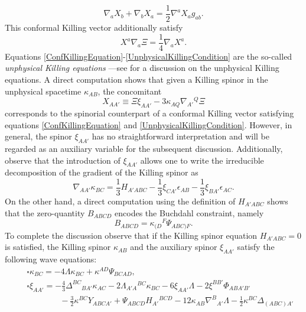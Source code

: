 \documentclass[10pt,a4paper]{article}
\theoremstyle{plain}
\begin{document}
\begin{equation}\label{ConfKillingEquation}
\nabla_{a}X_{b}+ \nabla_{b}X_{a}=\frac{1}{2}\nabla^{a}X_{a}g_{ab}.
\end{equation}
This conformal Killing vector additionally satisfy
\begin{equation}
\label{UnphysicalKillingCondition}
X^{a}\nabla_{a}\Xi=\frac{1}{4}\nabla_{a}X^{a}.
\end{equation}
Equations
\eqref{ConfKillingEquation}-\eqref{UnphysicalKillingCondition} are the
so-called \emph{unphysical Killing equations} ---see \cite{Pae14} for
a discussion on the unphysical Killing equations.  A direct
computation shows that given a Killing spinor in the unphysical
spacetime $\kappa_{AB}$, the concomitant
\begin{equation}
X_{AA'} \equiv \Xi \xi_{AA'}-3 \kappa_{AQ}\nabla_{A'}{}^{Q}\Xi
\end{equation}
corresponds to the spinorial counterpart of a conformal Killing vector
satisfying equations \eqref{ConfKillingEquation} and
\eqref{UnphysicalKillingCondition}.  However, in general, the
spinor $\xi_{AA'}$ has no straightforward interpretation and will be
regarded as an auxiliary variable for the subsequent discussion.
Additionally, observe that the introduction of $\xi_{AA'}$ allows one to
write the irreducible decomposition of the gradient of the Killing
spinor as
\begin{equation}\label{DecompositionDKappaAlt}
\nabla_{AA'}\kappa_{BC}=
\frac{1}{3}H_{A'ABC}-\frac{1}{3}\xi_{CA'}\epsilon_{AB}
-\frac{1}{3}\xi_{BA'}\epsilon_{AC}.
\end{equation}
On the other hand, a direct computation using the definition of
$H_{A'ABC}$ shows that the zero-quantity $B_{ABCD}$ encodes the
Buchdahl constraint, namely
\begin{equation}\label{BuchdahlInTermsOfWeylAndKillingSpinor}
B_{ABCD}= \kappa_{(D}{}^{F}\Psi_{ABC)F}.
\end{equation} 
To complete the discussion observe that if the Killing spinor equation
$H_{A'ABC}=0$ is satisfied, the Killing spinor $\kappa_{AB}$ and the
auxiliary spinor $\xi_{AA'}$ satisfy the following wave equations:
\begin{eqnarray} 
&& \square \kappa_{BC}=-4\Lambda\kappa_{BC} + \kappa^{AD}\Psi_{BCAD} ,
\label{WaveEquationKillingSpinor}\\
&& \square \xi_{AA'}=- \tfrac{4}{3} \Delta^{BC}{}_{BA'} \kappa_{AC} -
2 \Lambda_{A'A}{}^{BC} \kappa_{BC} - 6 \xi_{AA'} \Lambda - 2 \xi^{BB'}
\Phi_{ABA'B'}\nonumber \\ &&\qquad\qquad - \tfrac{3}{2} \kappa^{BC}
Y_{ABCA'} + \Psi_{ABCD} H_{A'}{}^{BCD} - 12 \kappa_{AB}
\nabla^{B}{}_{A'}\Lambda - \tfrac{1}{2} \kappa^{BC} \Delta_{(ABC)A'}
\label{WaveEquationAuxiliaryVariable}
\end{eqnarray}
\end{document}
